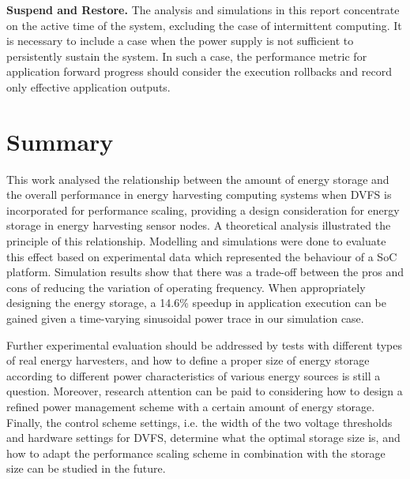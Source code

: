 \textbf{Suspend and Restore.} The analysis and simulations in this report concentrate on the active time of the system, excluding the case of intermittent computing. It is necessary to include a case when the power supply is not sufficient to persistently sustain the system. In such a case, the performance metric for application forward progress should consider the execution rollbacks and record only effective application outputs. 

\section{Summary}

This work analysed the relationship between the amount of energy storage and the overall performance in energy harvesting computing systems when DVFS is incorporated for performance scaling, providing a design consideration for energy storage in energy harvesting sensor nodes. A theoretical analysis illustrated the principle of this relationship. Modelling and simulations were done to evaluate this effect based on experimental data which represented the behaviour of a SoC platform. Simulation results show that there was a trade-off between the pros and cons of reducing the variation of operating frequency. When appropriately designing the energy storage, a 14.6\% speedup in application execution can be gained given a time-varying sinusoidal power trace in our simulation case. 

Further experimental evaluation should be addressed by tests with different types of real energy harvesters, and how to define a proper size of energy storage according to different power characteristics of various energy sources is still a question. Moreover, research attention can be paid to considering how to design a refined power management scheme with a certain amount of energy storage. Finally, the control scheme settings, i.e. the width of the two voltage thresholds and hardware settings for DVFS, determine what the optimal storage size is, and how to adapt the performance scaling scheme in combination with the storage size can be studied in the future. 


